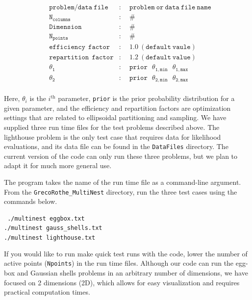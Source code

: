 \documentclass{article}
\def\mtt{\mathtt}
\def\mrm{\mathrm}
\begin{document}
\begin{align*}
&\mtt{problem/data \ file}    &:& \ \ \mtt{problem \ or \ data \ file \ name}\\
&\mtt{N_{columns}}  	     &:& \ \ \mtt{\#}\\       
&\mtt{Dimension} 	            &:& \ \ \mtt{\# }\\
&\mtt{N_{points}}                &:& \ \ \mtt{\#}\\
&\mtt{efficiency \  \ factor}   &:& \ \ \mtt{1.0 \ (default \ vaule)}\\  
&\mtt{repartition \  \ factor}  &:& \ \ \mtt{1.2 \ (default \ value)}\\
&\mtt{\theta_1}                    &:& \ \ \mtt{prior \  \ \  \theta_{1,min}  \  \ \ \theta_{1,max}}\\     
&\mtt{\theta_2}                    &:& \ \ \mtt{prior \  \  \ \theta_{2,min}  \  \ \  \theta_{2,max}}\\     
\end{align*}

\noindent Here, $\theta_i$ is the $i^\mrm{th}$ parameter, {\tt prior} is the prior probability distribution for a given parameter, and the efficiency and repartition factors are optimization settings that are related to ellipsoidal partitioning and sampling. We have supplied three run time files for the test problems described above. The lighthouse problem is the only test case that requires data for likelihood evaluations, and its data file can be found in the {\tt DataFiles} directory. The current version of the code can only run these three problems, but we plan to adapt it for much more general use. 

The program takes the name of the run time file as a command-line argument. From the {\tt GrecoRothe\_MultiNest} directory, run the three test cases using the commands below.

\begin{adjustwidth*}{3.6cm}{3.5cm}
 {\tt 
 ./multinest eggbox.txt\\
./multinest gauss\_shells.txt\\
 ./multinest lighthouse.txt\\
 }
 \end{adjustwidth*}
 
\noindent If you would like to run make quick test runs with the code, lower the number of active points ({\tt Npoints}) in the run time files. Although our code can run the egg-box and Gaussian shells problems in an arbitrary number of dimensions, we have focused on 2 dimensions (2D), which allows for easy visualization and requires practical computation times. 
\end{document}
